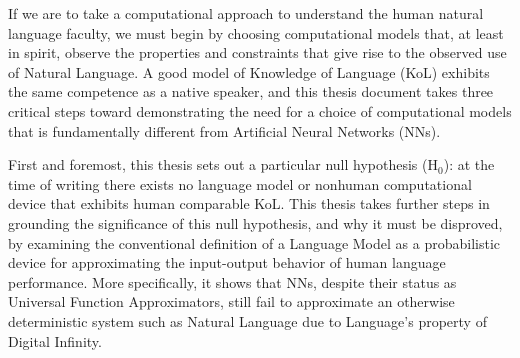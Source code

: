 % 
% 
%
If we are to take a computational approach to understand the human natural language faculty, we must begin by choosing computational models that, at least in spirit, observe the properties and constraints that give rise to the observed use of Natural Language.  A good model of Knowledge of Language (KoL) exhibits the same competence as a native speaker, and this thesis document takes three critical steps toward demonstrating the need for a choice of computational models that is fundamentally different from Artificial Neural Networks (NNs).  

First and foremost, this thesis sets out a particular null hypothesis ($\mathrm{H}_0$): at the time of writing there exists no language model or nonhuman computational device that exhibits human comparable KoL.  This thesis takes further steps in grounding the significance of this null hypothesis, and why it must be disproved, by examining the conventional definition of a Language Model as a probabilistic device for approximating the input-output behavior of human language performance.  More specifically, it shows that NNs, despite their status as Universal Function Approximators, still fail to approximate an otherwise deterministic system such as Natural Language due to Language's property of Digital Infinity.

